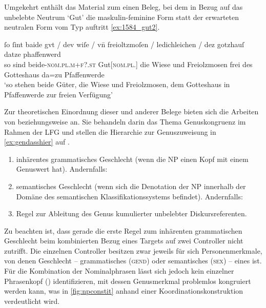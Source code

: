 Umgekehrt enthält das Material zum \CAO{} einen Beleg, bei dem in
Bezug auf das un\-belebte Neutrum  `Gut' die maskulin-feminine
Form  statt der erwarteten neutralen Form vom Typ 
auftritt \cref{ex:1584_gut2}.

\begin{exe}
\ex\label{ex:1584_gut2}
	\gll ſo ſint baide gvt / dev wiſe / vn̄ freioltzmoſen /
			ledichleichen / dez gotzhauſ datze phaffenwerd \\
		so sind beide-\textsc{nom.pl.m+f?\subI.st} Gut[\textsc{nom.pl.\NeutI}]
			{} die Wiese {} und Freiolzmosen {} frei {} des Gotteshaus da=zu
			Pfaffenwerde \\
	\trans `so stehen beide Güter, die Wiese und Freiolzmosen, dem Gotteshaus
		in Pfaffenwerde zur freien Verfügung'
		\parencites(Nr.~1584, Kl.~Herrenchiemsee, Kr.~Rosenheim, 1292)[727,26--27]{cao2}
\end{exe}

Zur theoretischen Einordnung dieser und anderer Belege bieten sich die Arbeiten
von \citet[171--195]{wechslerzlatic2003} beziehungsweise \citet{wechsler2009}
an. Sie behandeln darin das Thema Genus\-kongruenz im Rahmen der LFG
\autocites(vgl.~){bresnanetal2016} und stellen die
Hierarchie zur Genuszuweisung in \cref{ex:gendasshier} auf
\autocites[][584]{wechsler2009}[195]{wechslerzlatic2003}.

\begin{exe}
\ex\label{ex:gendasshier}
	\begin{enumerate}[noitemsep]
		\item inhärentes grammatisches Geschlecht (wenn die NP einen Kopf
			mit einem Genuswert hat). Andernfalls:
		\item semantisches Geschlecht (wenn sich die Denotation der NP
			innerhalb der Domäne des semantischen Klassifikationssystems
			befindet). Andernfalls:
		\item Regel zur Ableitung des Genus kumulierter unbelebter 
			Diskursreferenten.
	\end{enumerate}
\end{exe}

Zu beachten ist, dass gerade die erste Regel zum inhärenten grammatischen
Geschlecht beim kombinierten Bezug eines Targets auf zwei Controller nicht
zutrifft. Die einzelnen Controller besitzen zwar jeweils für sich
Personenmerkmale, von denen Geschlecht -- grammatisches (\textsc{gend}) oder
semantisches (\textsc{sex}) -- eines ist. Für die Kombination der
Nominalphrasen lässt sich jedoch kein einzelner Phrasenkopf ()
identifizieren, mit dessen Genusmerkmal problemlos kongruiert werden kann, was
in \cref{fig:npconstit} anhand einer Koordinations\-konstruktion verdeutlicht
wird.

